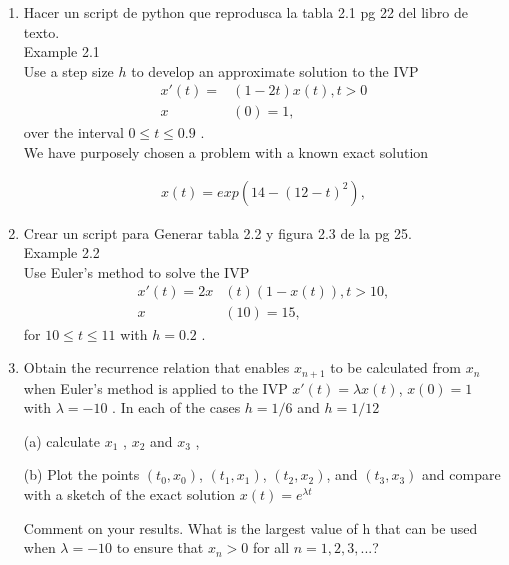  	
 	\begin{enumerate}
 	
 	\item
 	Hacer un script de python que reprodusca la tabla 2.1 pg 22 del libro de texto.	\\
 	Example 2.1\\
 	Use a step size $h$ to develop an approximate solution to the IVP
 	   \begin{align*}
 	     x'(t) = &(1 - 2t)x(t) , t>0 \\
 	     x&(0) = 1,
 	   \end{align*}
 	over the interval $0 \leq t \leq 0.9$ . \\
 	We have purposely chosen a problem with a known exact solution \
 	   
 	   \begin{align*}
	 	  x(t) = exp( 14 - ( 12 - t)^2 ), 
	   \end{align*}
 	      
 	\item
 	Crear un script para Generar tabla 2.2 y figura 2.3 de la pg 25.\\
 	Example 2.2\\
 	Use Euler’s method to solve the IVP
 	    \begin{align*}
 	    x'(t) = 2x&(t)( 1 - x(t)) , t > 10, \\
 	    x&(10) = 15, 
 	    \end{align*}    
 	for $ 10 \leq t \leq 11 $ with $h = 0.2$ .
 		
 	\item 
 	Obtain the recurrence relation that enables $ x_{n+1}$ to be calculated
 	from $x_n$ when Euler’s method is applied to the IVP  $x'(t) = \lambda x(t)$,
 	$x(0) = 1$ with $\lambda = - 10 $ . In each of the cases $h = 1/6$ and $h = 1/12$
 	\item[(a)]
 	calculate $x_1$ , $x_2$ and $x_3$ , \\
 	\item[(b)]
 	Plot the points $(t_0 , x_0 )$, $(t_1 , x_1 )$, $(t_2 , x_2 )$, and $(t_3 , x_3 )$ and compare
 	with a sketch of the exact solution  $x(t) = e^{\lambda t}$ 
 	
 	Comment on your results. What is the largest value of h that can be used when $\lambda = - 10 $ to ensure that $x_n > 0$ for all $n = 1, 2, 3, . . .$?
 	

\end{enumerate}
